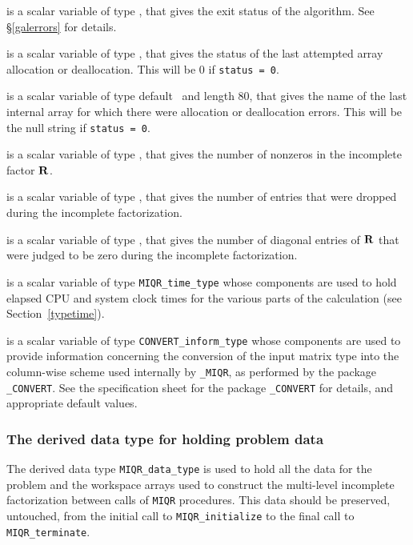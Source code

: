 \documentclass{galahad}
\newcommand{\packagename}{MIQR}
\newcommand{\fullpackagename}{\libraryname\_\packagename}
\begin{document}
\begin{description}

 is a scalar variable of type \integer, that gives the
exit status of the algorithm. 
See \S\ref{galerrors} 
for details.

 is a scalar variable of type \integer, that gives
the status of the last attempted array allocation or deallocation.
This will be 0 if {\tt status = 0}.

 is a scalar variable of type default \character\
and length 80, that  gives the name of the last internal array 
for which there were allocation or deallocation errors.
This will be the null string if {\tt status = 0}. 

 is a scalar variable of type \integer, that 
gives the number of nonzeros in the incomplete factor ${\mathbf{R}}$.

 is a scalar variable of type \integer, that 
gives the number of entries that were dropped during the incomplete 
factorization.

 is a scalar variable of type \integer, that 
gives the number of diagonal entries of ${\mathbf{R}}$ that were judged to be zero
during the incomplete factorization.

 is a scalar variable of type {\tt \packagename\_time\_type} 
whose components are used to hold elapsed CPU and system clock times for 
the various parts of the calculation (see Section~\ref{typetime}).

 is a scalar variable of type 
{\tt CONVERT\_inform\_type}
whose components are used to provide information concerning
the conversion of the input matrix type into the column-wise scheme 
used internally by  {\tt \fullpackagename}, as performed by the package 
{\tt \libraryname\_CONVERT}. 
See the specification sheet for the package 
{\tt \libraryname\_CONVERT} 
for details, and appropriate default values.

\end{description}


\subsubsection{The derived data type for holding problem data}\label{typedata}
The derived data type
{\tt \packagename\_data\_type} 
is used to hold all the data for the problem and the workspace arrays 
used to construct the multi-level incomplete factorization between calls of 
{\tt \packagename} procedures. 
This data should be preserved, untouched, from the initial call to 
{\tt \packagename\_initialize}
to the final call to
{\tt \packagename\_terminate}.
\end{document}
